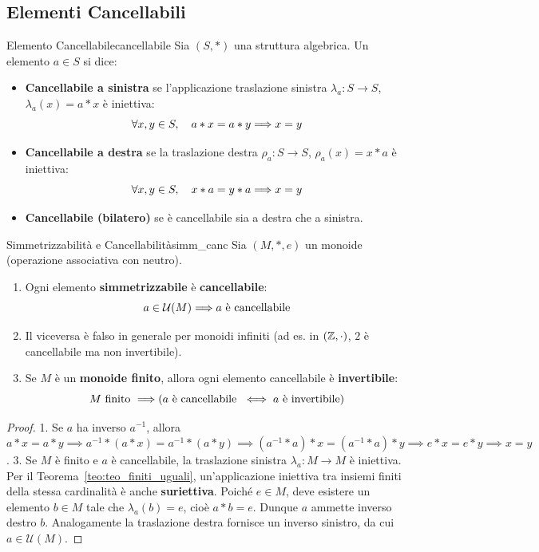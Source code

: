 \subsection{Elementi Cancellabili}

\begin{definizione}{Elemento Cancellabile}{cancellabile}
Sia $(S, *)$ una struttura algebrica. Un elemento $a \in S$ si dice:
\begin{itemize}
    \item \textbf{Cancellabile a sinistra} se l'applicazione traslazione sinistra $\lambda_a: S \to S$, $\lambda_a(x) = a * x$ è iniettiva:
    \[
        \forall x, y \in S, \quad a * x = a * y \Longrightarrow x = y
    \]
    \item \textbf{Cancellabile a destra} se la traslazione destra $\rho_a: S \to S$, $\rho_a(x) = x * a$ è iniettiva:
    \[
        \forall x, y \in S, \quad x * a = y * a \Longrightarrow x = y
    \]
    \item \textbf{Cancellabile (bilatero)} se è cancellabile sia a destra che a sinistra.
\end{itemize}
\end{definizione}

\begin{teorema}{Simmetrizzabilità e Cancellabilità}{simm_canc}
Sia $(M, *, e)$ un monoide (operazione associativa con neutro).
\begin{enumerate}
    \item Ogni elemento \textbf{simmetrizzabile} è \textbf{cancellabile}:
    \[
        a \in \mathcal{U}(M) \Longrightarrow a \text{ è cancellabile}
    \]
    \item Il viceversa è falso in generale per monoidi infiniti (ad es. in $(\mathbb{Z}, \cdot)$, $2$ è cancellabile ma non invertibile).
    \item Se $M$ è un \textbf{monoide finito}, allora ogni elemento cancellabile è \textbf{invertibile}:
    \[
        M \text{ finito } \Longrightarrow (a \text{ è cancellabile } \iff a \text{ è invertibile})
    \]
\end{enumerate}
\end{teorema}
\begin{proof}
1. Se $a$ ha inverso $a^{-1}$, allora $a * x = a * y \implies a^{-1} * (a * x) = a^{-1} * (a * y) \implies (a^{-1} * a) * x = (a^{-1} * a) * y \implies e * x = e * y \implies x = y$.
3. Se $M$ è finito e $a$ è cancellabile, la traslazione sinistra $\lambda_a: M \to M$ è iniettiva. Per il Teorema~\ref{teo:teo_finiti_uguali}, un'applicazione iniettiva tra insiemi finiti della stessa cardinalità è anche \textbf{suriettiva}. Poiché $e \in M$, deve esistere un elemento $b \in M$ tale che $\lambda_a(b) = e$, cioè $a * b = e$. Dunque $a$ ammette inverso destro $b$. Analogamente la traslazione destra fornisce un inverso sinistro, da cui $a \in \mathcal{U}(M)$.
\end{proof}

